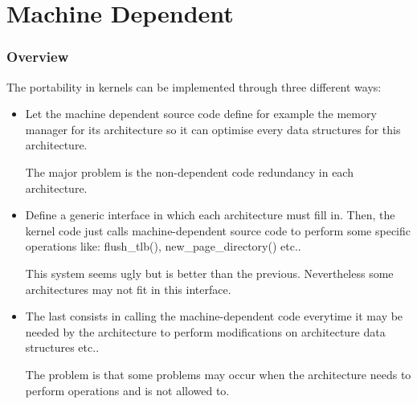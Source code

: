 %
%

\section{Machine Dependent}


\begin{frame}
  \frametitle{Overview}

  The portability in kernels can be implemented through three different
  ways:

  \begin{itemize}[<+->]
    \item
      Let the machine dependent source code define for example the memory
      manager for its architecture so it can optimise every data structures
      for this architecture.

      \nl

      The major problem is the non-dependent code redundancy
      in each architecture.
    \item
      Define a generic interface in which each architecture must fill in.
      Then, the kernel code just calls machine-dependent source code
      to perform some specific operations like: flush\_tlb(),
      new\_page\_directory() etc..

      \nl

      This system seems ugly but is better than the previous. Nevertheless
      some architectures may not fit in this interface.
    \item
      The last consists in calling the machine-dependent code everytime
      it may be needed by the architecture to perform modifications on
      architecture data structures etc..

      \nl

      The problem is that some problems may occur when the architecture
      needs to perform operations and is not allowed to.
  \end{itemize}
\end{frame}


